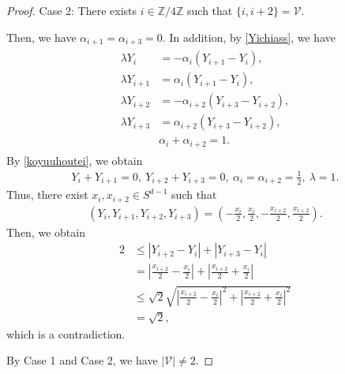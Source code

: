 \documentclass[reqno]{amsart}
\theoremstyle{plain}
\theoremstyle{definition}
\numberwithin{equation}{section}
\begin{document}
\begin{proof}
Case 2: There exists $i\in\mathbb{Z}/4\mathbb{Z}$ such that $\{i,i+2\}=\mathcal{V}$.



Then, we have $\alpha_{i+1}=\alpha_{i+3}=0$. In addition, by \eqref{Yichiass}, we have
\begin{align}\label{koyuuhoutei}
\begin{aligned}
\lambda Y_i&=-\alpha_i\left(Y_{i+1}-Y_i\right),
\\
\lambda Y_{i+1}&=\alpha_i\left(Y_{i+1}-Y_i\right),
\\
\lambda Y_{i+2}&=-\alpha_{i+2}\left(Y_{i+3}-Y_{i+2}\right),
\\
\lambda Y_{i+3}&=\alpha_{i+2}\left(Y_{i+3}-Y_{i+2}\right),
\\
&\alpha_i+\alpha_{i+2}=1.
\end{aligned}
\end{align}
By \eqref{koyuuhoutei}, we obtain
\begin{align*}
Y_i+Y_{i+1}=0,\ Y_{i+2}+Y_{i+3}=0,\ \alpha_i=\alpha_{i+2}=\frac{1}{2},\ \lambda=1.
\end{align*}
Thus, there exist $x_i,x_{i+2}\in S^{d-1}$ such that 
\begin{align*}
\left(Y_i,Y_{i+1},Y_{i+2},Y_{i+3}\right)=\left(-\frac{x_i}{2},\frac{x_i}{2},-\frac{x_{i+2}}{2},\frac{x_{i+2}}{2}\right).
\end{align*}
Then, we obtain
\begin{align*}
2&\leq \left|Y_{i+2}-Y_i\right|+\left|Y_{i+3}-Y_i\right|
\\
&=\left|\frac{x_{i+2}}{2}-\frac{x_i}{2}\right|+\left|\frac{x_{i+2}}{2}+\frac{x_i}{2}\right|
\\
&\leq \sqrt{2}\sqrt{\left|\frac{x_{i+2}}{2}-\frac{x_i}{2}\right|^2+\left|\frac{x_{i+2}}{2}+\frac{x_i}{2}\right|^2}
\\
&=\sqrt{2},
\end{align*}
which is a contradiction. 

By Case 1 and Case 2, we have $|\mathcal{V}|\neq 2$.


\end{proof}
\end{document}
